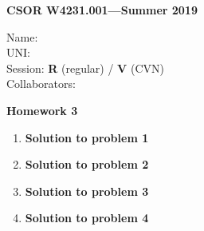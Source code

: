 \documentclass[11pt]{article}
\newcommand{\problemitem}[1]{
  \bigskip
  \item {\bf Solution to problem #1}
  \medskip
}
\begin{document}
\begin{flushright}
{\bf CSOR W4231.001---Summer 2019}
\end{flushright}
\begin{flushleft}
  Name: \\
  UNI: \\
  Session: {\bf R} (regular) / {\bf V} (CVN) \\ %
  Collaborators: \\ %
\end{flushleft}

\bigskip
\centerline{\bf Homework 3}

\begin{enumerate}

\problemitem{1}

\problemitem{2}

\problemitem{3}

\problemitem{4}

\end{enumerate}
\end{document}
